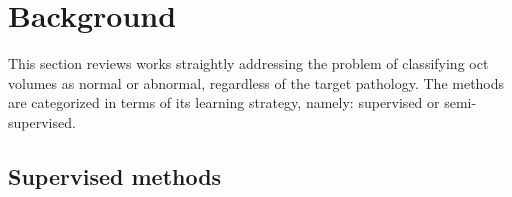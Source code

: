 \graphicspath{ {./content/method/figures/} }
\section{Background}\label{sec:review}
This section reviews works straightly addressing the problem of classifying \gls{oct} volumes as normal or abnormal, regardless of the target pathology.
The methods are categorized in terms of its learning strategy, namely: supervised or semi-supervised.


\subsection{Supervised methods}



